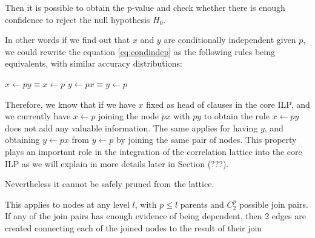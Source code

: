 Then it is possible to obtain the p-value and check whether there is enough confidence to reject the null hypothesis
$H_0$. 


In other words if we find out that $x$ and $y$ are conditionally independent given $p$, we could rewrite the equation
\ref{eq:condindep} as the following rules being equivalents, with similar accuracy distributions:

\begin{center}
  $x \leftarrow py \equiv x \leftarrow p $ \newline 
  $y \leftarrow px \equiv y \leftarrow p $
\end{center}

Therefore, we know that if we have $x$ fixed as head of clauses in the core ILP, and we currently have $x \leftarrow p$
joining the node $px$ with $py$ to obtain the rule $x \leftarrow py$ does not add any valuable information. The same
applies
for having $y$, and obtaining $y \leftarrow px$ from $y \leftarrow p$ by joining the same pair of nodes. This property
plays an important role in the integration of the correlation lattice into the core ILP as we will explain in more
details later in Section (???).

Nevertheless it cannot be safely pruned from the lattice.  

\begin{comment}
In level 1 from \graphname, nodes can be directly pruned, on the other hand, for further levels, for a node to be
pruned by independence, all the possible joins resulting the node must be independent. In level 2, for example, in order
to prune the node $r a_1 b_1 c_1$, given that in level 1 the nodes $r a_1 b_1$, $r a_1 c_1$ and $r b_1 c_1$ were not
pruned. All the three possible join combinations should fail the independence test, i.e.:

\begin{equation}
\begin{split} 
  freq(r a_1 b_1 c_1) &\approx freq(r a_1)p (r b_1|r a_1) p(r c_1|r a_1) \\ 
  &\approx  freq(r b_1) p(r a_1|r b_1) p(r c_1|r b_1) \\ 
  &\approx  freq(r c_1) p(r a_1|r c_1) p(r b_1|r c_1)  
\end{split}
\end{equation}
\end{comment}

This applies to nodes at any level $l$, with $p \leq l$ parents and $C_{2}^{p}$ possible join pairs. If any of the join
pairs has enough evidence of being dependent, then 2 edges are created connecting each of the joined
nodes to the result of their join

